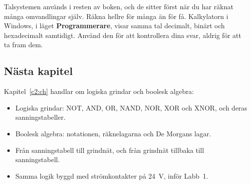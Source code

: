 Talsystemen används i resten av boken, och de sitter först när du har räknat många omvandlingar
själv. Räkna hellre för många än för få. Kalkylatorn i Windows, i läget \textbf{Programmerare},
visar samma tal decimalt, binärt och hexadecimalt samtidigt. Använd den för att kontrollera dina
svar, aldrig för att ta fram dem.

\subsection*{Nästa kapitel}
Kapitel~\ref{c2:ch} handlar om logiska grindar och boolesk algebra:
\begin{itemize}
  \item Logiska grindar: NOT, AND, OR, NAND, NOR, XOR och XNOR, och deras sanningstabeller.
  \item Boolesk algebra: notationen, räknelagarna och De Morgans lagar.
  \item Från sanningstabell till grindnät, och från grindnät tillbaka till sanningstabell.
  \item Samma logik byggd med strömkontakter på 24~V, inför Labb~1.
\end{itemize}
